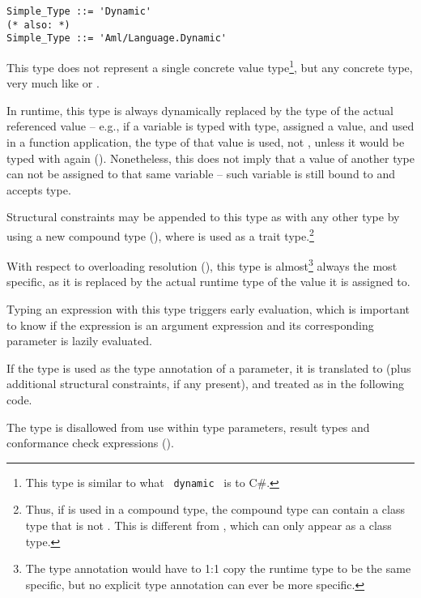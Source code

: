 \syntax\begin{lstlisting}[morekeywords={Dynamic},deletekeywords={also}]
Simple_Type ::= 'Dynamic'
(* also: *)
Simple_Type ::= 'Aml/Language.Dynamic'
\end{lstlisting}

This type does not represent a single concrete value type\footnote{This type is similar to what ~\lstinline[language={[Sharp]C}]!dynamic!~ is to C\#.}, but any concrete type, very much like  or . 

In runtime, this type is always dynamically replaced by the type of the actual referenced value -- e.g., if a variable is typed with  type, assigned a value, and used in a function application, the type of that value is used, not , unless it would be typed with  again (). Nonetheless, this does not imply that a value of another type can not be assigned to that same variable -- such variable is still bound to  and accepts  type. 

Structural constraints may be appended to this type as with any other type by using a new compound type (), where  is used as a trait type.\footnote{Thus, if  is used in a compound type, the compound type can contain a class type that is not . This is different from , which can only appear as a class type.}

With respect to overloading resolution (), this type is almost\footnote{The type annotation would have to 1:1 copy the runtime type to be the same specific, but no explicit type annotation can ever be more specific.} always the most specific, as it is replaced by the actual runtime type of the value it is assigned to. 

Typing an expression with this type triggers early evaluation, which is important to know if the expression is an argument expression and its corresponding parameter is lazily evaluated. 

If the  type is used as the type annotation of a parameter, it is translated to  (plus additional structural constraints, if any present), and treated as  in the following code.

The  type is disallowed from use within type parameters, result types and conformance check expressions (). 

